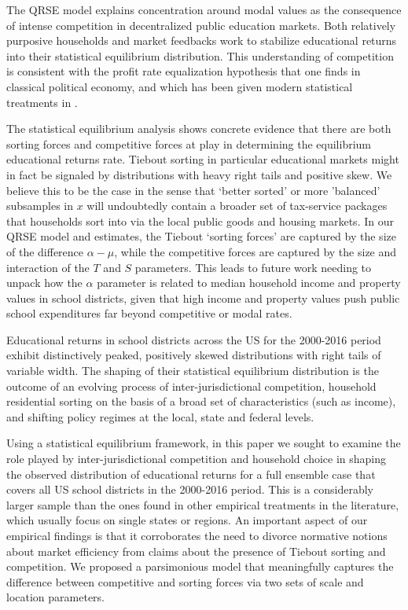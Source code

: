 \begin{table}[htbp]
{\medskip 


The QRSE model explains concentration around modal values as
the consequence of intense competition in decentralized public
education markets. Both relatively purposive households and market
feedbacks work to stabilize educational returns into their statistical
equilibrium distribution. This understanding of competition is consistent with the profit rate
equalization hypothesis that one finds in classical political economy,
and which has been given modern statistical treatments in
\citep{farjoun_laws_2020,schafsim,alfarano_statistical_2012,schafol}.

\medskip 

The statistical equilibrium analysis shows concrete evidence  that there are both
sorting forces and competitive forces at play in determining the equilibrium 
educational returns rate. Tiebout sorting in particular educational markets might 
in fact be signaled by distributions with heavy right tails and positive skew. We believe
this to be the case in the sense that `better sorted' or more
'balanced' subsamples in $x$ will undoubtedly contain a broader set of
tax-service packages that households sort into via the local public
goods and housing markets. In our QRSE model and estimates, the Tiebout `sorting forces' are
captured by the size of the difference $\alpha - \mu$, while the
competitive forces are captured by the size and interaction of the $T$
and $S$ parameters. This leads to future work needing to unpack how
the $\alpha$ parameter is related to median household
income and property values in school districts, given that high income
and property values push public school expenditures far beyond
competitive or modal rates. 


Educational returns in school districts across the US for the
2000-2016 period exhibit distinctively peaked, positively skewed
distributions with right tails of variable width. The shaping of their
statistical equilibrium distribution is the outcome of an evolving
process of inter-jurisdictional competition, household residential
sorting on the basis of a broad set of characteristics (such as
income), and shifting policy regimes at the local, state and federal
levels.

\medskip 

Using a statistical equilibrium framework, in this paper we sought to
examine the role played by inter-jurisdictional competition and
household choice in shaping the observed distribution of educational
returns for a full ensemble case that covers all US school districts
in the 2000-2016 period. This is a considerably larger sample than the
ones found in other empirical treatments in the literature, which
usually focus on single states or regions. An
important aspect of our empirical findings is that it corroborates the
need to divorce normative notions about market efficiency from claims about the presence of Tiebout sorting and competition. We proposed a parsimonious model that
meaningfully captures the difference between competitive and sorting
forces via two sets of scale and location parameters. 

}
\end{table}
